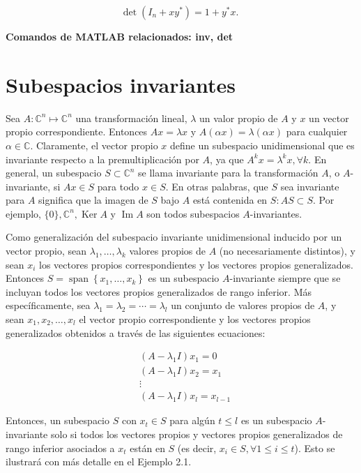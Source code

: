 $$
\operatorname{det}\left(I_{n}+x y^{*}\right)=1+y^{*} x \text {. }
$$

\textbf{Comandos de MATLAB relacionados: inv, det}

\section{Subespacios invariantes}
Sea $A: \mathbb{C}^{n} \longmapsto \mathbb{C}^{n}$ una transformación lineal, $\lambda$ un valor propio de $A$ y $x$ un vector propio correspondiente. Entonces $A x=\lambda x$ y $A(\alpha x)=\lambda(\alpha x)$ para cualquier $\alpha \in \mathbb{C}$. Claramente, el vector propio $x$ define un subespacio unidimensional que es invariante respecto a la premultiplicación por $A$, ya que $A^{k} x=\lambda^{k} x, \forall k$. En general, un subespacio $S \subset \mathbb{C}^{n}$ se llama invariante para la transformación $A$, o $A$-invariante, si $A x \in S$ para todo $x \in S$. En otras palabras, que $S$ sea invariante para $A$ significa que la imagen de $S$ bajo $A$ está contenida en $S: A S \subset S$. Por ejemplo, $\{0\}, \mathbb{C}^{n}, \operatorname{Ker} A$ y $\operatorname{Im} A$ son todos subespacios $A$-invariantes.

Como generalización del subespacio invariante unidimensional inducido por un vector propio, sean $\lambda_{1}, \ldots, \lambda_{k}$ valores propios de $A$ (no necesariamente distintos), y sean $x_{i}$ los vectores propios correspondientes y los vectores propios generalizados. Entonces $S=\operatorname{span}\left\{x_{1}, \ldots, x_{k}\right\}$ es un subespacio $A$-invariante siempre que se incluyan todos los vectores propios generalizados de rango inferior. Más específicamente, sea $\lambda_{1}=\lambda_{2}=\cdots=\lambda_{l}$ un conjunto de valores propios de $A$, y sean $x_{1}, x_{2}, \ldots, x_{l}$ el vector propio correspondiente y los vectores propios generalizados obtenidos a través de las siguientes ecuaciones:

$$
\begin{aligned}
& \left(A-\lambda_{1} I\right) x_{1}=0 \\
& \left(A-\lambda_{1} I\right) x_{2}=x_{1} \\
& \vdots \\
& \left(A-\lambda_{1} I\right) x_{l}=x_{l-1}
\end{aligned}
$$

Entonces, un subespacio $S$ con $x_{t} \in S$ para algún $t \leq l$ es un subespacio $A$-invariante solo si todos los vectores propios y vectores propios generalizados de rango inferior asociados a $x_{t}$ están en $S$ (es decir, $x_{i} \in S, \forall 1 \leq i \leq t$). Esto se ilustrará con más detalle en el Ejemplo 2.1.

